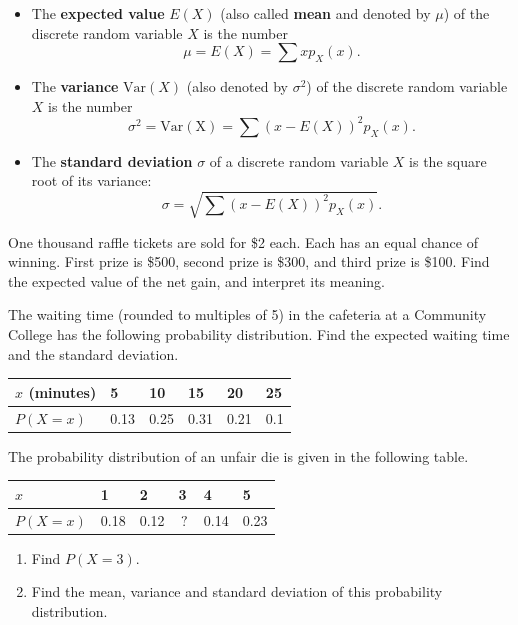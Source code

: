 \begin{itemize}
\item
  The \textbf{expected value} \(E(X)\) (also called \textbf{mean} and
  denoted by \(\mu\)) of the discrete random variable \(X\) is the
  number \[\mu=E(X)=\sum xp_X(x).\]
\item
  The \textbf{variance} \(\mathrm{Var}(X)\) (also denoted by
  \(\sigma^2\)) of the discrete random variable \(X\) is the number
  \[\sigma^2=\mathrm{Var(X)}=\sum (x-E(X))^2p_X(x).\]
\item
  The \textbf{standard deviation} \(\sigma\) of a discrete random
  variable \(X\) is the square root of its variance:
  \[\sigma=\sqrt{\sum (x-E(X))^2p_X(x)}.\]
\end{itemize}

\begin{example}

One thousand raffle tickets are sold for \$2 each. Each has an equal
chance of winning. First prize is \$500, second prize is \$300, and
third prize is \$100. Find the expected value of the net gain, and interpret
its meaning.

\end{example}

\begin{example}

The waiting time (rounded to multiples of 5) in the cafeteria at a
Community College has the following probability distribution. Find the
expected waiting time and the standard deviation.

\begin{longtable}[]{@{}llllll@{}}
\toprule()
\(x\) (minutes) & 5 & 10 & 15 & 20 & 25 \\
\midrule()
\endhead
\(P(X=x)\) & 0.13 & 0.25 & 0.31 & 0.21 & 0.1 \\
\bottomrule()
\end{longtable}

\end{example}

\begin{example}

The probability distribution of an unfair die is given in the following
table.

\begin{longtable}[]{@{}llllll@{}}
\toprule()
\(x\) & 1 & 2 & 3 & 4 & 5 \\
\midrule()
\endhead
\(P(X=x)\) & 0.18 & 0.12 & \(\,?\,\) & 0.14 & 0.23 \\
\bottomrule()
\end{longtable}

\begin{enumerate}
\item
  Find \(P(X=3)\).
\item
  Find the mean, variance and standard deviation of this probability
  distribution.
\end{enumerate}

\end{example}

